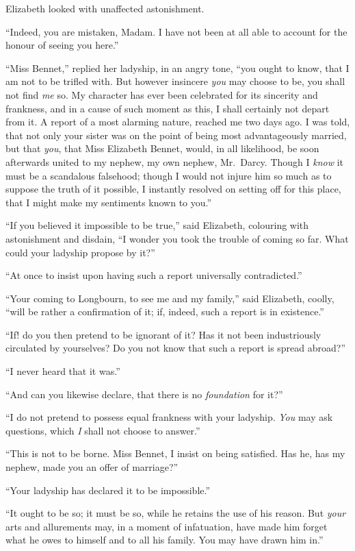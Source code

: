 Elizabeth looked with unaffected astonishment.

“Indeed, you are mistaken, Madam. I have not been
at all able to account for the honour of seeing you here.”

“Miss Bennet,” replied her ladyship, in an angry tone,
“you ought to know, that I am not to be trifled with.
But however insincere \textit{you} may choose to be, you shall
not find \textit{me} so. My character has ever been celebrated
for its sincerity and frankness, and in a cause of such
moment as this, I shall certainly not depart from it.
A report of a most alarming nature, reached me two days
ago. I was told, that not only your sister was on the
point of being most advantageously married, but that \textit{you},
that Miss Elizabeth Bennet, would, in all likelihood, be
soon afterwards united to my nephew, my own nephew,
Mr.\ Darcy. Though I \textit{know} it must be a scandalous
falsehood; though I would not injure him so much as
to suppose the truth of it possible, I instantly resolved
on setting off for this place, that I might make my sentiments
known to you.”

“If you believed it impossible to be true,” said Elizabeth,
colouring with astonishment and disdain, “I wonder you
took the trouble of coming so far. What could your
ladyship propose by it?”

“At once to insist upon having such a report universally
contradicted.”

“Your coming to Longbourn, to see me and my family,”
said Elizabeth, coolly, “will be rather a confirmation of
it; if, indeed, such a report is in existence.”

“If! do you then pretend to be ignorant of it? Has
it not been industriously circulated by yourselves? Do
you not know that such a report is spread abroad?”

“I never heard that it was.”

“And can you likewise declare, that there is no \textit{foundation}
for it?”

“I do not pretend to possess equal frankness with your
ladyship. \textit{You} may ask questions, which \textit{I} shall not choose
to answer.”

“This is not to be borne. Miss Bennet, I insist on being
satisfied. Has he, has my nephew, made you an offer of
marriage?”

“Your ladyship has declared it to be impossible.”

“It ought to be so; it must be so, while he retains the
use of his reason. But \textit{your} arts and allurements may,
in a moment of infatuation, have made him forget what
he owes to himself and to all his family. You may have
drawn him in.”

